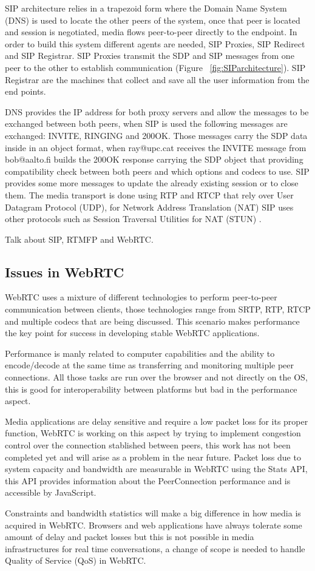 SIP architecture relies in a trapezoid form where the Domain Name System (DNS) is used to locate the other peers of the system, once that peer is located and session is negotiated, media flows peer-to-peer directly to the endpoint. In order to build this system different agents are needed, SIP Proxies, SIP Redirect and SIP Registrar. SIP Proxies transmit the SDP and SIP messages from one peer to the other to establish communication (Figure ~\ref{fig:SIParchitecture}). SIP Registrar are the machines that collect and save all the user information from the end points.

DNS provides the IP address for both proxy servers and allow the messages to be exchanged between both peers, when SIP is used the following messages are exchanged: INVITE, RINGING and 200OK. Those messages carry the SDP data inside in an object format, when ray@upc.cat receives the INVITE message from bob@aalto.fi builds the 200OK response carrying the SDP object that providing compatibility check between both peers and which options and codecs to use. SIP provides some more messages to update the already existing session or to close them. The media transport is done using RTP and RTCP that rely over User Datagram Protocol (UDP), for Network Address Translation (NAT) SIP uses other protocols such as Session Traversal Utilities for NAT (STUN) \cite{sipRFC}.


Talk about SIP, RTMFP and WebRTC.



\subsection{Issues in WebRTC}

WebRTC uses a mixture of different technologies to perform peer-to-peer communication between clients, those technologies range from SRTP, RTP, RTCP and multiple codecs that are being discussed. This scenario makes performance the key point for success in developing stable WebRTC applications. 

Performance is manly related to computer capabilities and the ability to encode/decode at the same time as transferring and monitoring multiple peer connections. All those tasks are run over the browser and not directly on the OS, this is good for interoperability between platforms but bad in the performance aspect. 

Media applications are delay sensitive and require a low packet loss for its proper function, WebRTC is working on this aspect by trying to implement congestion control over the connection stablished between peers, this work has not been completed yet and will arise as a problem in the near future. Packet loss due to system capacity and bandwidth are measurable in WebRTC using the Stats API, this API provides information about the PeerConnection performance and is accessible by JavaScript.

Constraints and bandwidth statistics will make a big difference in how media is acquired in WebRTC. Browsers and web applications have always tolerate some amount of delay and packet losses but this is not possible in media infrastructures for real time conversations, a change of scope is needed to handle Quality of Service (QoS) in WebRTC.

